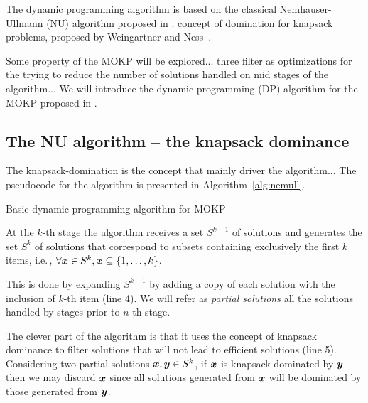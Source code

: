 

The dynamic programming algorithm is based on the classical Nemhauser-Ullmann (NU) algorithm proposed
in \cite{nemhauser1969discrete}.
concept of domination for knapsack problems,
proposed by Weingartner and Ness~\cite{weingartner1967methods}.

Some property of the MOKP will be explored...
three filter as optimizations for the trying
to reduce the number of solutions
handled on mid stages of the algorithm...
We will introduce the dynamic programming (DP) algorithm for the MOKP proposed in \cite{bazgan2009}.


\subsection{The NU algorithm -- the knapsack dominance}
The knapsack-domination is the concept that mainly driver the algorithm...
The pseudocode for the algorithm is presented in Algorithm~\ref{alg:nemull}.
\begin{algorithm}
  \caption{Basic dynamic programming algorithm for MOKP}
  \label{alg:nemull}
  
\end{algorithm}
At the $k$-th stage the algorithm receives a set $S^{k-1}$ of solutions and
generates the set $S^k$ of solutions that correspond
to subsets containing exclusively the first $k$ items, i.e.\,,
$\forall\boldsymbol{x} \in S^k, \boldsymbol{x} \subseteq \{1, \ldots, k\}$.

This is done by expanding $S^{k-1}$ by adding a copy of each solution with the
inclusion of $k$-th item (line 4).
We will refer as \emph{partial solutions} all the solutions handled by 
stages prior to $n$-th stage.

The clever part of the algorithm is that it uses the concept of knapsack dominance
to filter solutions that will not lead to efficient solutions (line 5).
Considering two partial solutions $\boldsymbol{x}, \boldsymbol{y} \in S^k$, if
$\boldsymbol{x}$ is knapsack-dominated by $\boldsymbol{y}$ then we may discard $\boldsymbol{x}$ since all
solutions generated from $\boldsymbol{x}$ will be dominated by those generated from $\boldsymbol{y}$.

